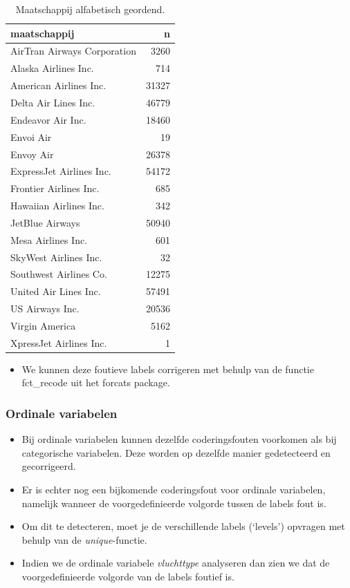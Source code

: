 \documentclass[]{tufte-book}
\providecommand{\tightlist}{%
  \setlength{\itemsep}{0pt}\setlength{\parskip}{0pt}}
\begin{document}
\begin{table}

\caption{\label{tab:5-6b}Maatschappij alfabetisch geordend.}
\centering
\fontsize{10}{12}\selectfont
\begin{tabular}[t]{lr}
\toprule
maatschappij & n\\
\midrule
AirTran Airways Corporation & 3260\\
Alaska Airlines Inc. & 714\\
American Airlines Inc. & 31327\\
Delta Air Lines Inc. & 46779\\
Endeavor Air Inc. & 18460\\
\addlinespace
Envoi Air & 19\\
Envoy Air & 26378\\
ExpressJet Airlines Inc. & 54172\\
Frontier Airlines Inc. & 685\\
Hawaiian Airlines Inc. & 342\\
\addlinespace
JetBlue Airways & 50940\\
Mesa Airlines Inc. & 601\\
SkyWest Airlines Inc. & 32\\
Southwest Airlines Co. & 12275\\
United Air Lines Inc. & 57491\\
\addlinespace
US Airways Inc. & 20536\\
Virgin America & 5162\\
XpressJet Airlines Inc. & 1\\
\bottomrule
\end{tabular}
\end{table}

\begin{itemize}
\tightlist
\item
  We kunnen deze foutieve labels corrigeren met behulp van de functie fct\_recode uit het forcats package.
\end{itemize}

\hypertarget{ordinale-variabelen}{%
\subsubsection{Ordinale variabelen}\label{ordinale-variabelen}}

\begin{itemize}
\tightlist
\item
  Bij ordinale variabelen kunnen dezelfde coderingsfouten voorkomen als bij categorische variabelen. Deze worden op dezelfde manier gedetecteerd en gecorrigeerd.
\item
  Er is echter nog een bijkomende coderingsfout voor ordinale variabelen, namelijk wanneer de voorgedefinieerde volgorde tussen de labels fout is.
\item
  Om dit te detecteren, moet je de verschillende labels (`levels') opvragen met behulp van de \emph{unique}-functie.
\item
  Indien we de ordinale variabele \emph{vluchttype} analyseren dan zien we dat de voorgedefinieerde volgorde van de labels foutief is.
\end{itemize}
\end{document}

